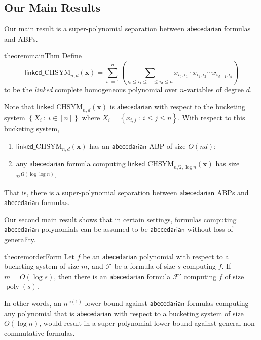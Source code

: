 \documentclass[10pt,a4paper]{article}
\def\poly{\operatorname{poly}}
\def\inparen#1{\left( #1 \right)}
\def\inbrace#1{\left\{ #1 \right\}}
\def\setdef#1#2{\inbrace{ #1 \ : \ #2}}
\def\vecx{\mathbf{x}}
\newcommand{\form}{\textbf{$\mathcal{F}$}}
\newcommand{\abcd}{\mathsf{abecedarian}}
\newcommand{\lchsym}[2]{\mathrm{\mathsf{linked}\_CHSYM}_{#1,#2}}
\begin{document}
\subsection{Our Main Results}

Our main result is a super-polynomial separation between $\abcd$ formulas and ABPs.

\begin{restatable}{theorem}{mainThm}\label{thm:main}
	Define 
	\[
		\lchsym{n}{d}(\vecx) = \sum_{i_0=1}^{n} \inparen{\sum_{i_0 \leq i_1 \leq \ldots \leq i_d \leq n} x_{i_0, i_1} \cdot x_{i_1,i_2} \cdots x_{i_{d-1}, i_d}}
	\]
	to be the \emph{linked} complete homogeneous polynomial over $n$-variables of degree $d$.

	Note that $\lchsym{n}{d}(\vecx)$ is $\abcd$ with respect to the bucketing system $\setdef{X_i}{i \in [n]}$ where $X_i = \setdef{x_{i,j}}{i \leq j \leq n}$. With respect to this bucketing system,  
	\begin{enumerate}
		\item $\lchsym{n}{d}(\vecx)$ has an $\abcd$ ABP of size $O(nd)$;
		
		\item any $\abcd$ formula computing $\lchsym{n/2}{\log n}(\vecx)$ has size $n^{\Omega(\log \log n)}$.
	\end{enumerate}
	That is, there is a super-polynomial separation between $\abcd$ ABPs and $\abcd$ formulas.
\end{restatable}

Our second main result shows that in certain settings, formulas computing $\abcd$ polynomials can be assumed to be $\abcd$ without loss of generality.


\begin{restatable}{theorem}{orderForm}\label{thm:orderForm}
	Let $f$ be an $\abcd$ polynomial with respect to a bucketing system of size $m$, and $\form$ be a formula of size $s$ computing $f$.
	If $m = O(\log s)$, then there is an $\abcd$ formula  $\form'$ computing $f$ of size $\poly(s)$.
\end{restatable}


\noindent In other words, an $n^{\omega(1)}$ lower bound against $\abcd$ formulas computing any polynomial that is $\abcd$ with respect to a bucketing system of size $O(\log n)$, would result in a super-polynomial lower bound against general non-commutative formulas.\\
\end{document}
